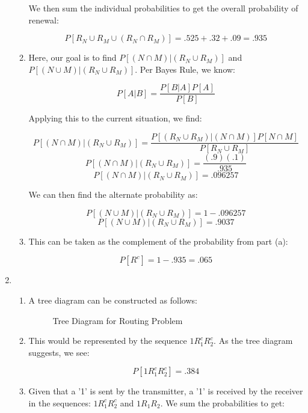\begin{enumerate}
\begin{enumerate}
        We then sum the individual probabilities to get the overall probability of renewal:

        $$\boxed{P[R_N\cup R_M\cup (R_N\cap R_M)]=.525+.32+.09=.935}$$

      \item Here, our goal is to find $P[(N\cap M)|(R_N\cup R_M)]$ and $P[(N\cup M)|(R_N\cup R_M)]$. Per Bayes Rule, we know:

        $$P[A|B]=\frac{P[B|A]P[A]}{P[B]}$$

        Applying this to the current situation, we find:

        $$P[(N\cap M)|(R_N\cup R_M)]=\frac{P[(R_N\cup R_M) |(N\cap M)]P[N\cap M]}{P[R_N\cup R_M]}$$
        $$P[(N\cap M)|(R_N\cup R_M)]=\frac{(.9)(.1)}{.935}$$
        $$\boxed{P[(N\cap M)|(R_N\cup R_M)]=.096257}$$

        We can then find the alternate probability as:

        $$P[(N\cup M)|(R_N\cup R_M)]=1-.096257$$
        $$\boxed{P[(N\cup M)|(R_N\cup R_M)]=.9037}$$

      \item This can be taken as the complement of the probability from part (a):

        $$\boxed{P[R^c]=1-.935=.065}$$

    \end{enumerate}

  \item

    \begin{enumerate}

      \item A tree diagram can be constructed as follows:

        \begin{figure}[H]
          \centering
          
          \caption{Tree Diagram for Routing Problem}
          \label{fig:1}
        \end{figure}

      \item This would be represented by the sequence $1R_1^cR_2^c$. As the tree diagram suggests, we see:

        $$\boxed{P[1R_1^cR_2^c]=.384}$$

      \item Given that a '1' is sent by the transmitter, a '1' is received by the receiver in the sequences: $1R_1^cR_2^c$ and $1R_1R_2$. We sum the probabilities to get:


\end{enumerate}
\end{enumerate}
